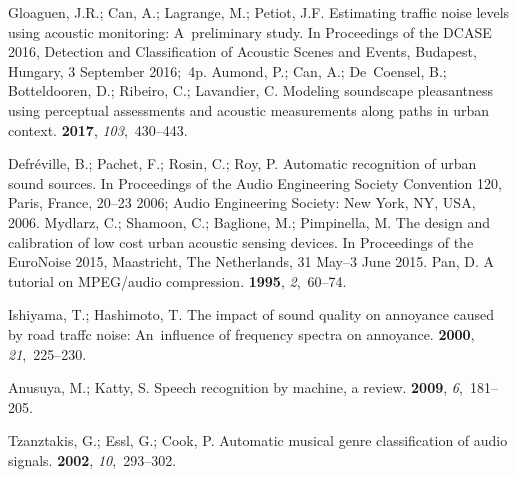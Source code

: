 \documentclass[sensors,article,accept,moreauthors,pdftex,10pt,a4paper]{mdpi}
\begin{document}
\begin{thebibliography}{999}
Gloaguen, J.R.; Can, A.; Lagrange, M.; Petiot, J.F.
\newblock Estimating traffic noise levels using acoustic monitoring: A~preliminary study.
\newblock  In Proceedings of the DCASE 2016, Detection and Classification of Acoustic Scenes and
  Events, {Budapest, Hungary, 3  September} 2016;~4p.
{Aumond, P.; Can, A.; De~Coensel, B.; Botteldooren, D.; Ribeiro, C.; Lavandier,
  C.}
\newblock Modeling soundscape pleasantness using perceptual assessments and
  acoustic measurements along paths in urban context.
 {\bf 2017}, {\em
  103},~430--443.

Defr{\'e}ville, B.; Pachet, F.; Rosin, C.; Roy, P.
\newblock Automatic recognition of urban sound sources.
\newblock  In Proceedings of the Audio Engineering Society Convention 120, {Paris, France, 20--23} 2006;   Audio Engineering Society: {New York, NY, USA,}  2006.
Mydlarz, C.; Shamoon, C.; Baglione, M.; Pimpinella, M.
\newblock The design and calibration of low cost urban acoustic sensing
  devices.
\newblock  In Proceedings of the EuroNoise 2015, {Maastricht, The Netherlands, 31 May--3 June} 2015.
Pan, D.
\newblock A tutorial on MPEG/audio compression.
 {\bf 1995}, {\em 2},~60--74.

Ishiyama, T.; Hashimoto, T.
\newblock The impact of sound quality on annoyance caused by road traffc noise:
  An~influence of frequency spectra on annoyance.
 {\bf 2000}, {\em 21},~225--230.

Anusuya, M.; Katty, S.
\newblock Speech recognition by machine, a review.
 {\bf 2009}, {\em 6},~181--205.

Tzanztakis, G.; Essl, G.; Cook, P.
\newblock Automatic musical genre classification of audio signals.
 {\bf 2002},
  {\em 10},~293--302.


\end{thebibliography}
\end{document}
